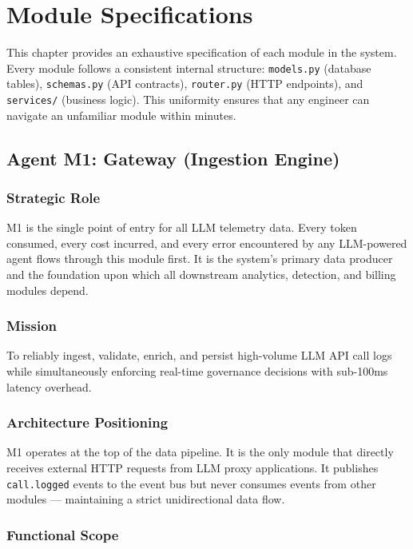 \documentclass[12pt,a4paper,twoside]{report}
\begin{document}
\chapter{Module Specifications}

This chapter provides an exhaustive specification of each module in the system. Every module follows a consistent internal structure: \texttt{models.py} (database tables), \texttt{schemas.py} (API contracts), \texttt{router.py} (HTTP endpoints), and \texttt{services/} (business logic). This uniformity ensures that any engineer can navigate an unfamiliar module within minutes.

\section{Agent M1: Gateway (Ingestion Engine)}

\subsection{Strategic Role}
M1 is the single point of entry for all LLM telemetry data. Every token consumed, every cost incurred, and every error encountered by any LLM-powered agent flows through this module first. It is the system's primary data producer and the foundation upon which all downstream analytics, detection, and billing modules depend.

\subsection{Mission}
To reliably ingest, validate, enrich, and persist high-volume LLM API call logs while simultaneously enforcing real-time governance decisions with sub-100ms latency overhead.

\subsection{Architecture Positioning}
M1 operates at the top of the data pipeline. It is the only module that directly receives external HTTP requests from LLM proxy applications. It publishes \texttt{call.logged} events to the event bus but never consumes events from other modules — maintaining a strict unidirectional data flow.

\subsection{Functional Scope}
\end{document}
